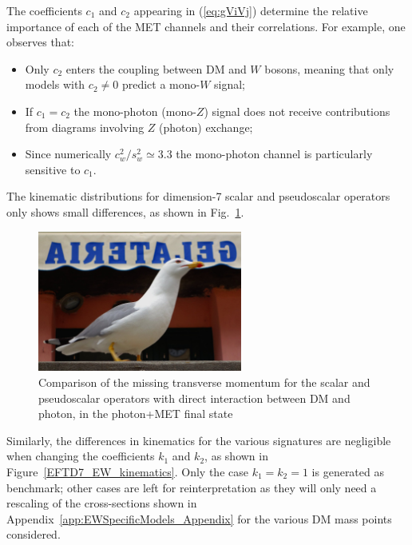 The coefficients $c_1$ and $c_2$ appearing in (\ref{eq:gViVj}) determine the relative importance of each of the MET channels and their correlations. For example, one observes that:
\begin{itemize}
 \item Only $c_2$ enters the coupling between DM and $W$ bosons, meaning that only models with $c_2 \neq 0$ predict a mono-$W$ signal;
 \item If $c_1 = c_2$ the mono-photon (mono-$Z$) signal does not receive contributions from diagrams involving $Z$ (photon) exchange;
  \item Since numerically $c_w^2/s_w^2 \simeq 3.3$ the mono-photon channel is particularly sensitive to $c_1$.
\end{itemize}



The kinematic distributions for dimension-7 scalar and pseudoscalar operators
only shows small differences, as shown in Fig.~\ref{fig:EW_EFT5_gamma_MET}.

\begin{figure}
    \includegraphics[width=0.6\textwidth]{figures/llug}
    \caption{Comparison of the missing transverse momentum for the scalar and pseudoscalar
    operators with direct interaction between DM and photon, in the photon+MET final state}
    \label{fig:EW_EFT5_gamma_MET}
\end{figure}

Similarly, the differences in kinematics for the various signatures
are negligible when changing the coefficients $k_1$ and $k_2$, as shown
in Figure~\ref{EFTD7_EW_kinematics}. Only the case $k_1=k_2=1$ is generated as benchmark;
other cases are left for reinterpretation as they will only need a rescaling of the cross-sections
shown in Appendix~\ref{app:EWSpecificModels_Appendix} for the various DM
mass points considered.

